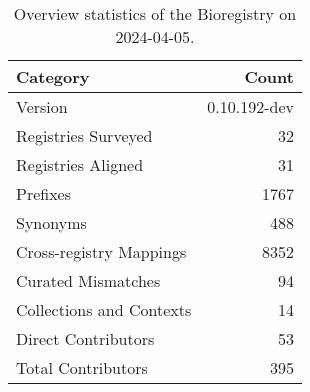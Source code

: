 \begin{table}
\caption{Overview statistics of the Bioregistry on 2024-04-05.}
\label{tab:bioregistry-summary}
\begin{tabular}{lr}
\toprule
Category & Count \\
\midrule
Version & 0.10.192-dev \\
Registries Surveyed & 32 \\
Registries Aligned & 31 \\
Prefixes & 1767 \\
Synonyms & 488 \\
Cross-registry Mappings & 8352 \\
Curated Mismatches & 94 \\
Collections and Contexts & 14 \\
Direct Contributors & 53 \\
Total Contributors & 395 \\
\bottomrule
\end{tabular}
\end{table}
